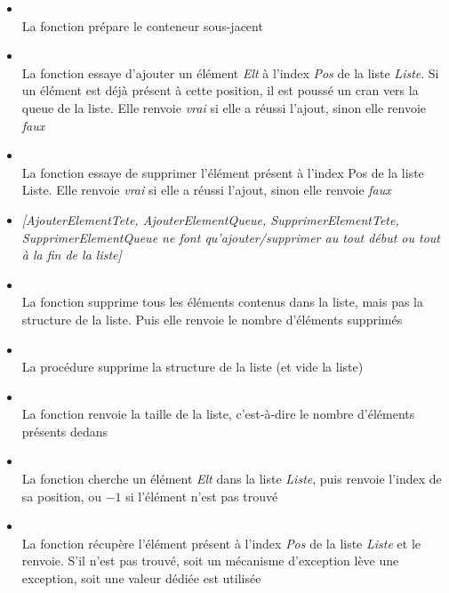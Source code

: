 \documentclass[11pt,a4paper]{article}
\begin{document}
\begin{itemize}
\item {}\\
      La fonction prépare le conteneur sous-jacent
\item {}\\
      La fonction essaye d'ajouter un élément \textit{Elt} à l'index \textit{Pos} de la liste \textit{Liste}. Si un élément est déjà présent à cette position, il est poussé un cran vers la queue de la liste. Elle renvoie \textit{vrai} si elle a réussi l'ajout, sinon elle renvoie \textit{faux}
\item {}\\
      La fonction essaye de supprimer l'élément présent à l'index Pos de la liste Liste.  Elle renvoie \textit{vrai} si elle a réussi l'ajout, sinon elle renvoie \textit{faux}
\item \textit{[AjouterElementTete, AjouterElementQueue, SupprimerElementTete, SupprimerElementQueue ne font qu'ajouter/supprimer au tout début ou tout à la fin de la liste]}
\item {}\\
      La fonction supprime tous les éléments contenus dans la liste, mais pas la structure de la liste. Puis elle renvoie le nombre d'éléments supprimés
\item {}\\
      La procédure supprime la structure de la liste (et vide la liste)
\item {}\\
      La fonction renvoie la taille de la liste, c'est-à-dire le nombre d'éléments présents dedans
\item {}\\
      La fonction cherche un élément \textit{Elt} dans la liste \textit{Liste}, puis renvoie l'index de sa position, ou $ -1 $ si l'élément n'est pas trouvé
\item {}\\
      La fonction récupère l'élément présent à l'index \textit{Pos} de la liste \textit{Liste} et le renvoie. S'il n'est pas trouvé, soit un mécanisme d'exception lève une exception, soit une valeur dédiée est utilisée
\end{itemize}
\end{document}

